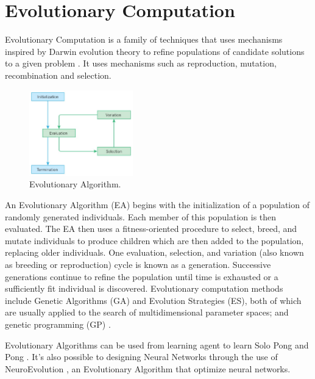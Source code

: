 \section{Evolutionary Computation}

Evolutionary Computation is a family of techniques that uses mechanisms inspired by Darwin evolution theory to refine populations of candidate solutions to a given problem \cite{vikhar2016evolutionary}. It uses mechanisms such as reproduction, mutation, recombination and selection.

\begin{figure}[ht]
    \centering
    \includegraphics[width=0.4\textwidth]{images/Evolutionary_algorithms.jpg}
    \caption{Evolutionary Algorithm.}
\end{figure}

An Evolutionary Algorithm (EA) begins with the initialization of a population of randomly generated individuals. Each member of this population is then evaluated. The EA then uses a fitness-oriented procedure to select, breed, and mutate individuals to produce children which are then added to the population, replacing older individuals. One evaluation, selection, and variation (also known as breeding or reproduction) cycle is known as a generation. Successive generations continue to refine the population until time is exhausted or a sufficiently fit individual is discovered. Evolutionary computation methods include Genetic Algorithms (GA) and Evolution Strategies (ES), both of which are usually applied to the search of multidimensional parameter spaces; and genetic programming (GP) \cite{panait2005cooperative, vikhar2016evolutionary}.

Evolutionary Algorithms can be used from learning agent to learn Solo Pong \cite{langdon2005evolutionary} and Pong \cite{mcbrien2020learning}.
It's also possible to designing Neural Networks through the use of NeuroEvolution \cite{stanley2019designing}, an Evolutionary Algorithm that optimize neural networks.
